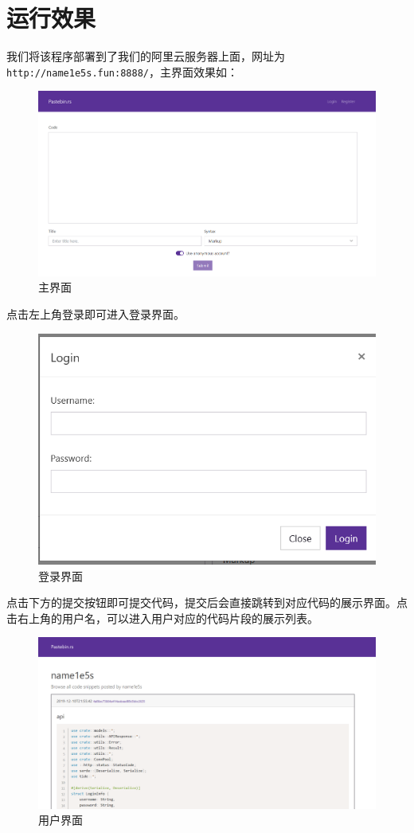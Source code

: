 \documentclass[ichigo,normal,cn]{elegantnote}
\newcommand{\code}[1]{\colorbox{light-gray}{\texttt{#1}}}
\begin{document}
\section{运行效果}

我们将该程序部署到了我们的阿里云服务器上面，网址为 \code{http://name1e5s.fun:8888/}，主界面效果如：

\begin{figure}[!htbp]
    \centering
    \includegraphics[width=.8\textwidth]{main}
    \caption{主界面}
    \label{fig:main}
\end{figure}

点击左上角登录即可进入登录界面。

\begin{figure}[!htbp]
    \centering
    \includegraphics[width=.8\textwidth]{login}
    \caption{登录界面}
    \label{fig:login}
\end{figure}

点击下方的提交按钮即可提交代码，提交后会直接跳转到对应代码的展示界面。点击右上角的用户名，可以进入用户对应的代码片段的展示列表。

\begin{figure}[!htbp]
    \centering
    \includegraphics[width=.8\textwidth]{user}
    \caption{用户界面}
    \label{fig:user}
\end{figure}
\end{document}
